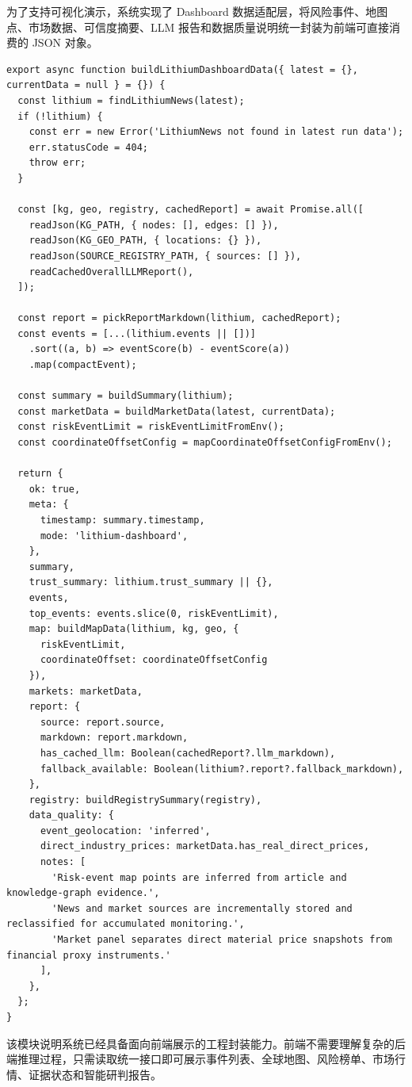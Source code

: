 \documentclass[12pt,a4paper]{article}
\begin{document}
为了支持可视化演示，系统实现了 Dashboard 数据适配层，将风险事件、地图点、市场数据、可信度摘要、LLM 报告和数据质量说明统一封装为前端可直接消费的 JSON 对象。

\begin{lstlisting}[style=projectcode,caption={风险仪表盘数据聚合与前端适配}]
export async function buildLithiumDashboardData({ latest = {}, currentData = null } = {}) {
  const lithium = findLithiumNews(latest);
  if (!lithium) {
    const err = new Error('LithiumNews not found in latest run data');
    err.statusCode = 404;
    throw err;
  }

  const [kg, geo, registry, cachedReport] = await Promise.all([
    readJson(KG_PATH, { nodes: [], edges: [] }),
    readJson(KG_GEO_PATH, { locations: {} }),
    readJson(SOURCE_REGISTRY_PATH, { sources: [] }),
    readCachedOverallLLMReport(),
  ]);

  const report = pickReportMarkdown(lithium, cachedReport);
  const events = [...(lithium.events || [])]
    .sort((a, b) => eventScore(b) - eventScore(a))
    .map(compactEvent);

  const summary = buildSummary(lithium);
  const marketData = buildMarketData(latest, currentData);
  const riskEventLimit = riskEventLimitFromEnv();
  const coordinateOffsetConfig = mapCoordinateOffsetConfigFromEnv();

  return {
    ok: true,
    meta: {
      timestamp: summary.timestamp,
      mode: 'lithium-dashboard',
    },
    summary,
    trust_summary: lithium.trust_summary || {},
    events,
    top_events: events.slice(0, riskEventLimit),
    map: buildMapData(lithium, kg, geo, {
      riskEventLimit,
      coordinateOffset: coordinateOffsetConfig
    }),
    markets: marketData,
    report: {
      source: report.source,
      markdown: report.markdown,
      has_cached_llm: Boolean(cachedReport?.llm_markdown),
      fallback_available: Boolean(lithium?.report?.fallback_markdown),
    },
    registry: buildRegistrySummary(registry),
    data_quality: {
      event_geolocation: 'inferred',
      direct_industry_prices: marketData.has_real_direct_prices,
      notes: [
        'Risk-event map points are inferred from article and knowledge-graph evidence.',
        'News and market sources are incrementally stored and reclassified for accumulated monitoring.',
        'Market panel separates direct material price snapshots from financial proxy instruments.'
      ],
    },
  };
}
\end{lstlisting}

该模块说明系统已经具备面向前端展示的工程封装能力。前端不需要理解复杂的后端推理过程，只需读取统一接口即可展示事件列表、全球地图、风险榜单、市场行情、证据状态和智能研判报告。
\end{document}
